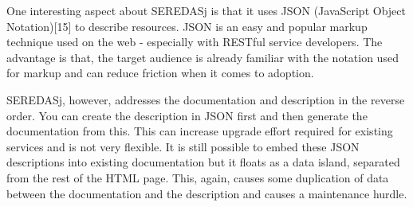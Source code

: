 \begin{spacing}{1.5}
One interesting aspect about SEREDASj is that it uses JSON (JavaScript Object Notation)[15] to describe resources. JSON is an easy and popular markup technique used on the web - especially with RESTful service developers. The advantage is that, the target audience is already familiar with the notation used for markup and can reduce friction when it comes to adoption.
         
SEREDASj, however, addresses the documentation and description in the reverse order. You can create the description in JSON first and then generate the documentation from this. This can increase upgrade effort required for existing services and is not very flexible. It is still possible to embed these JSON descriptions into existing documentation but it floats as a data island, separated from the rest of the HTML page. This, again, causes some duplication of data between the documentation and the description and causes a maintenance hurdle. 
\end{spacing}